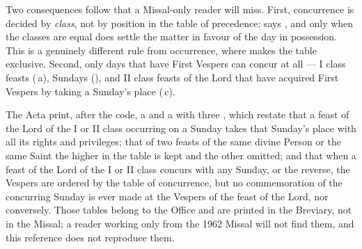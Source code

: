 Two consequences follow that a Missal-only reader will miss. First, concurrence is decided by
\emph{class}, not by position in the table of precedence:  says , and only when the classes are equal does  settle the matter in favour of
the day in possession. This is a genuinely different rule from occurrence, where  makes the
table exclusive. Second, only days that have First Vespers can concur at all — I class feasts
(\,a), Sundays (), and II class feasts of the Lord that have acquired First Vespers
by taking a Sunday's place (\,c).

The Acta print, after the code, a  and a  with three , which restate that a feast of the Lord of the I or II
class occurring on a Sunday takes that Sunday's place with all its rights and privileges; that
of two feasts of the same divine Person or the same Saint the higher in the table is kept and
the other omitted; and that when a feast of the Lord of the I or II class concurs with any
Sunday, or the reverse, the Vespers are ordered by the table of concurrence, but no
commemoration of the concurring Sunday is ever made at the Vespers of the feast of the Lord, nor
conversely. Those tables belong to the Office and are printed in the Breviary, not in the Missal;
a reader working only from the 1962 Missal will not find them, and this reference does not
reproduce them.
